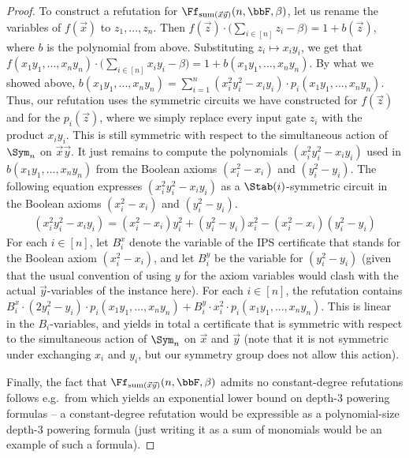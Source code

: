 \documentclass[a4paper,UKenglish,cleveref, autoref, thm-restate]{lipics-v2021}
\begin{document}
\begin{proof}
	To construct a refutation for $\Ff_{\text{sum}(\vec x\vec y)}(n,\bbF,\beta)$, let us rename the variables of $f(\vec x)$ to $z_1,...,z_n$. Then $f(\vec z) \cdot \Big(\sum_{i \in [n]} z_i - \beta \Big) = 1+b(\vec z)$, where $b$ is the polynomial from above. Substituting $z_i \mapsto x_iy_i$, we get that $f(x_1y_1,...,x_ny_n) \cdot \Big(\sum_{i \in [n]} x_iy_i - \beta \Big) = 1+b(x_1y_1,...,x_ny_n)$. By what we showed above, $b(x_1y_1,...,x_ny_n) = \sum_{i=1}^n (x_i^2y_i^2-x_iy_i) \cdot p_i(x_1y_1,...,x_ny_n)$. Thus, our refutation uses the symmetric circuits we have constructed for $f(\vec z)$ and for the $p_i(\vec z)$, where we simply replace every input gate $z_i$ with the product $x_iy_i$. This is still symmetric with respect to the simultaneous action of $\Sym_n$ on $\vec x\vec y$. 
	It just remains to compute the polynomials $(x_i^2y_i^2-x_iy_i)$ used in $b(x_1y_1,...,x_ny_n)$ from the Boolean axioms $(x_i^2-x_i)$ and $(y_i^2-y_i)$. The following equation expresses $(x_i^2y_i^2-x_iy_i)$ as a $\Stab(i)$-symmetric circuit in the Boolean axioms $(x_i^2-x_i)$ and $(y_i^2-y_i)$.
	\begin{align*}
		(x_i^2y_i^2-x_iy_i) = (x_i^2-x_i)y_i^2 + (y_i^2-y_i)x_i^2-(x_i^2-x_i)(y_i^2-y_i)
	\end{align*}	
	For each $i \in [n]$, let $B_i^x$ denote the variable of the IPS certificate that stands for the Boolean axiom $(x_i^2-x_i)$, and let $B_i^y$ be the variable for  $(y_i^2-y_i)$ (given that the usual convention of using $y$ for the axiom variables would clash with the actual $\vec y$-variables of the instance here).
	For each $i \in [n]$, the refutation contains $B_i^x \cdot (2y_i^2 - y_i) \cdot p_i(x_1y_1,...,x_ny_n) + B_i^y \cdot x_i^2  \cdot p_i(x_1y_1,...,x_ny_n)$. This is linear in the $B_i$-variables, and yields in total a certificate that is symmetric with respect to the simultaneous action of $\Sym_n$ on $\vec x$ and $\vec y$ (note that it is not symmetric under exchanging $x_i$ and $y_i$, but our symmetry group does not allow this action).
	
	Finally, the fact that $\Ff_{\text{sum}(\vec x\vec y)}(n,\bbF,\beta)$ admits no constant-degree refutations follows e.g.\ from \cite[Corollary 5.9]{lowerbounds_IPS} which yields an exponential lower bound on depth-3 powering formulas -- a constant-degree refutation would be expressible as a polynomial-size depth-3 powering formula (just writing it as a sum of monomials would be an example of such a formula).
\end{proof}	
\end{document}
